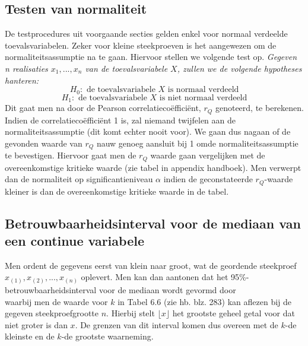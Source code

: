 \documentclass[titlepage]{article}
\numberwithin{equation}{section}
\begin{document}
\subsection{Testen van normaliteit}
De testprocedures uit voorgaande secties gelden enkel voor normaal verdeelde toevalsvariabelen. Zeker voor kleine steekproeven is het aangewezen om de normaliteitsassumptie na te gaan. Hiervoor stellen we volgende test op.\newline\newline
\emph{Gegeven n realisaties $x_1, ... , x_n$ van de toevalsvariabele $X$, zullen we de volgende hypotheses hanteren:
\begin{equation}
	H_0: \text{   de toevalsvariabele $X$ is normaal verdeeld}
	\label{6.18}
\end{equation}
\begin{equation*}
	H_1: \text{   de toevalsvariabele $X$ is niet normaal verdeeld}
\end{equation*}}
Dit gaat men na door de Pearson correlatiecoëfficiënt, $r_Q$ genoteerd, te berekenen. Indien de correlatiecoëfficiënt 1 is, zal  niemand twijfelen aan de normaliteitsassumptie (dit komt echter nooit voor). We gaan dus nagaan of de gevonden waarde van $r_Q$ nauw genoeg aansluit bij 1 omde normaliteitsassumptie te bevestigen. Hiervoor gaat men de $r_Q$ waarde gaan vergelijken met de overeenkomstige kritieke waarde (zie tabel in appendix handboek). Men verwerpt dan de normaliteit op significantieniveau $\alpha$ indien de geconstateerde $r_Q$-waarde kleiner is dan de overeenkomstige kritieke waarde in de tabel.
\subsection{Betrouwbaarheidsinterval voor de mediaan van een continue variabele}
Men ordent de gegevens eerst van klein naar groot, wat de geordende steekproef $x_{(1)}, x_{(2)}, ... , x_{(n)}$ oplevert. Men kan dan aantonen dat het 95\%-betrouwbaarheidsinterval voor de mediaan wordt gevormd door
\begin{equation*}
	[x_{(k)}, x_{(n-k+1)}]
\end{equation*}
waarbij men de waarde voor $k$ in Tabel 6.6 (zie hb. blz. 283) kan aflezen bij de gegeven steekproefgrootte $n$. Hierbij stelt $\lfloor x\rfloor$ het grootste geheel getal voor dat niet groter is dan $x$. De grenzen van dit interval komen dus overeen met de $k$-de kleinste en de $k$-de grootste waarneming.
\end{document}

